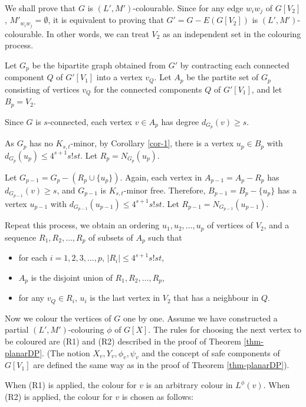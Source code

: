 \documentclass[11pt,a4paper]{article}
\theoremstyle{definition}
\begin{document}
We shall prove that $G$ is $(L',M')$-colourable.
Since for any edge $w_iw_j$ of $G[V_2]$, $M'_{w_iw_j} = \emptyset$, it is equivalent to proving that $G'=G-E(G[V_2])$ is $(L',M')$-colourable. In other words, we can treat $V_2$ as an independent set in the colouring process. 

Let $G_p$ be the bipartite graph obtained from $G'$ by contracting  each connected component $Q$ of $G'[V_1]$ into a vertex $v_Q$.  
Let $A_p$ be the partite set of $G_p$ consisting of vertices $v_Q$ for the connected components $Q$ of $G'[V_1]$, and let $B_p=V_2$.

 
Since $G$ is $s$-connected, each vertex $v \in A_p$ has degree $d_{G_p}(v) \ge s$. 

As $G_p$ has no $K_{s,t}$-minor, by Corollary \ref{cor-1},  there is a vertex $u_p \in B_p$ with $d_{G_p}(u_p) \le 4^{s+1}s!st$. Let $R_p = N_{G_p}(u_p)$.

Let $G_{p-1} = G_p- (R_p \cup \{u_p\})$. Again, each vertex in $A_{p-1}=A_p-R_p$ has $d_{G_{p-1}}(v) \ge s$, and $G_{p-1}$ is $K_{s,t}$-minor free. Therefore, $B_{p-1}=B_p-\{u_p\} $ has a vertex $u_{p-1}$ with $d_{G_{p-1}}(u_{p-1}) \le 4^{s+1}s!st$. Let $R_{p-1} = N_{G_{p-1}}(u_{p-1})$. 

Repeat this process, we obtain an ordering $u_1,u_2, \ldots, u_p$ of vertices of $V_2$, and a sequence   $R_1,R_2,\ldots, R_p$ of subsets of $A_p$ such that  
\begin{itemize}
	\item for each $i=1, 2,3,\ldots, p$,   $|R_i| \le 4^{s+1}s!st$,
 \item $A_p$ is the disjoint union of $R_1,R_2,\ldots, R_p$,
	\item for any $v_Q \in R_i$, $u_i$ is the last vertex in $V_2$ that has a neighbour in $Q$.
	\end{itemize}

 


Now we colour the vertices of $G$ one by one. Assume we have constructed a partial $(L',M')$-colouring $\phi$ of $G[X]$. The rules for choosing the next vertex to be coloured are  (R1) and (R2) described in the proof of Theorem \ref{thm-planarDP}.  (The notion $X_v, Y_v, \phi_v, \psi_v$ and the concept of safe components of $G[V_1]$ are defined the same way as in the proof of Theorem \ref{thm-planarDP}).
 


When (R1) is applied, the colour for $v$ is an arbitrary colour in $L^{\phi}(v)$. When (R2) is applied, the colour for $v$ is chosen as follows: 
\end{document}
